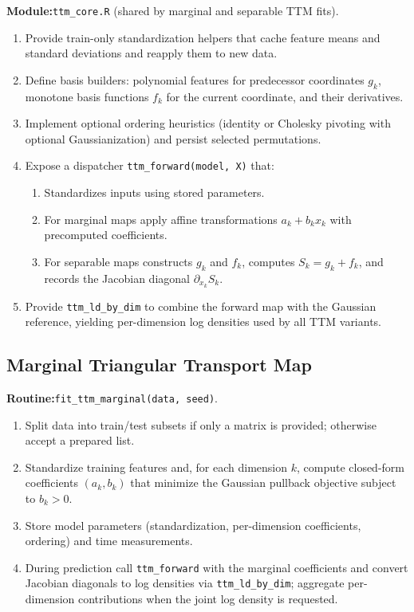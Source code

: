 \documentclass[11pt,a4paper,twoside]{book}\usepackage[]{graphicx}\usepackage[]{xcolor}
\begin{document}
\textbf{Module:}\quad\texttt{ttm\_core.R} (shared by marginal and separable TTM fits).

\begin{enumerate}
 \item Provide train-only standardization helpers that cache feature means and standard deviations and reapply them to new data.
 \item Define basis builders: polynomial features for predecessor coordinates $g_k$, monotone basis functions $f_k$ for the current coordinate, and their derivatives.
 \item Implement optional ordering heuristics (identity or Cholesky pivoting with optional Gaussianization) and persist selected permutations.
 \item Expose a dispatcher \texttt{ttm\_forward(model, X)} that:
 \begin{enumerate}
 \item Standardizes inputs using stored parameters.
 \item For marginal maps apply affine transformations $a_k + b_k x_k$ with precomputed coefficients.
 \item For separable maps constructs $g_k$ and $f_k$, computes $S_k = g_k + f_k$, and records the Jacobian diagonal $\partial_{x_k} S_k$.
 \end{enumerate}
 \item Provide \texttt{ttm\_ld\_by\_dim} to combine the forward map with the Gaussian reference, yielding per-dimension log densities used by all TTM variants.
\end{enumerate}

\subsection{Marginal Triangular Transport Map}\label{app:ttm-marg}

\textbf{Routine:}\quad\texttt{fit\_ttm\_marginal(data, seed)}.

\begin{enumerate}
 \item Split data into train/test subsets if only a matrix is provided; otherwise accept a prepared list.
 \item Standardize training features and, for each dimension $k$, compute closed-form coefficients $(a_k, b_k)$ that minimize the Gaussian pullback objective subject to $b_k > 0$.
 \item Store model parameters (standardization, per-dimension coefficients, ordering) and time measurements.
 \item During prediction call \texttt{ttm\_forward} with the marginal coefficients and convert Jacobian diagonals to log densities via \texttt{ttm\_ld\_by\_dim}; aggregate per-dimension contributions when the joint log density is requested.
\end{enumerate}
\end{document}
